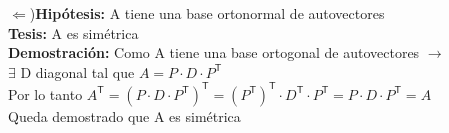 \documentclass[11pt]{article}
\begin{document}
\begin{enumerate}
$\Leftarrow$){\bfseries {Hipótesis:}} A tiene una base ortonormal de autovectores\\
{\bfseries {Tesis:}} A es simétrica\\
\textbf{Demostración:} Como A tiene una base ortogonal de
autovectores $\rightarrow$\\
$\exists$ D diagonal tal que $A = P \cdot D \cdot P ^\mathsf{T} $\\
Por lo tanto $A^\mathsf{T}=(P \cdot D \cdot P ^\mathsf{T})^\mathsf{T}= (P^\mathsf{T})^\mathsf{T} \cdot D^\mathsf{T} \cdot P ^\mathsf{T} = P \cdot D \cdot P ^\mathsf{T} = A$\\
Queda demostrado que A es simétrica
\end{enumerate}
\end{document}
